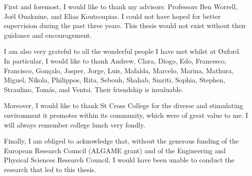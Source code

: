 \begin{acknowledgements}
First and foremost, I would like to thank my advisors: Professors Ben Worrell, Jo\"{e}l Ouaknine, and Elias Koutsoupias. I could not have hoped for better supervision during the past three years. This thesis would not exist without their guidance and encouragement.

I am also very grateful to all the wonderful people I have met whilst at Oxford. In particular, I would like to thank Andrew, Clara, Diogo, Edo, Francesco, Francisco, Gon\c{c}alo, Jasper, Jorge, Luis, Mafalda, Marcelo, Marina, Mathura, Miguel, Nikola, Philippos, Rita, Sebouh, Shahab, Smriti, Sophia, Stephen, Straulino, Tom\'{a}s, and Ventsi. Their friendship is invaluable.

Moreover, I would like to thank St Cross College for the diverse and stimulating environment it promotes within its community, which were of great value to me. I will always remember college lunch very fondly.



Finally, I am obliged to acknowledge that, without the generous funding of the European Research Council (ALGAME grant) and of the Engineering and Physical Sciences Research Council, I would have been unable to conduct the research that led to this thesis.
\end{acknowledgements}
